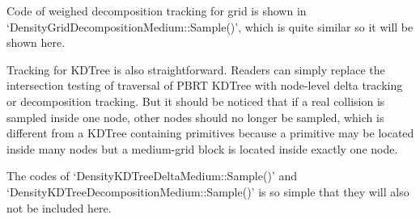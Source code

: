 \documentclass[acmtog]{acmart}
\begin{document}
\lstset{basicstyle=\small\ttfamily}
    Code of weighed decomposition tracking for grid is shown in `DensityGridDecompositionMedium::Sample()', 
    which is quite similar so it will be shown here.\par
        Tracking for KDTree is also straightforward.
    Readers can simply replace the intersection testing of traversal of PBRT KDTree with node-level delta tracking or decomposition tracking.
    But it should be noticed that if a real collision is sampled inside one node, other nodes should no longer be sampled, 
    which is different from a KDTree containing primitives because a primitive may be located inside many nodes but a medium-grid block is located inside exactly one node.\par
        The codes of `DensityKDTreeDeltaMedium::Sample()' and `DensityKDTreeDecompositionMedium::Sample()' is so simple that they will also not be included here.
\end{document}
